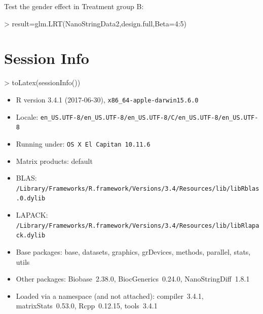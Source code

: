 \documentclass[12pt]{article}
\begin{document}
Test the gender effect in Treatment group B:
\begin{Schunk}
\begin{Sinput}
> result=glm.LRT(NanoStringData2,design.full,Beta=4:5)
\end{Sinput}
\end{Schunk}



\section{Session Info}

\begin{Schunk}
\begin{Sinput}
> toLatex(sessionInfo())
\end{Sinput}
\begin{itemize}\raggedright
  \item R version 3.4.1 (2017-06-30), \verb|x86_64-apple-darwin15.6.0|
  \item Locale: \verb|en_US.UTF-8/en_US.UTF-8/en_US.UTF-8/C/en_US.UTF-8/en_US.UTF-8|
  \item Running under: \verb|OS X El Capitan 10.11.6|
  \item Matrix products: default
  \item BLAS: \verb|/Library/Frameworks/R.framework/Versions/3.4/Resources/lib/libRblas.0.dylib|
  \item LAPACK: \verb|/Library/Frameworks/R.framework/Versions/3.4/Resources/lib/libRlapack.dylib|
  \item Base packages: base, datasets, graphics, grDevices, methods,
    parallel, stats, utils
  \item Other packages: Biobase~2.38.0, BiocGenerics~0.24.0,
    NanoStringDiff~1.8.1
  \item Loaded via a namespace (and not attached): compiler~3.4.1,
    matrixStats~0.53.0, Rcpp~0.12.15, tools~3.4.1
\end{itemize}\end{Schunk}


\end{document}

